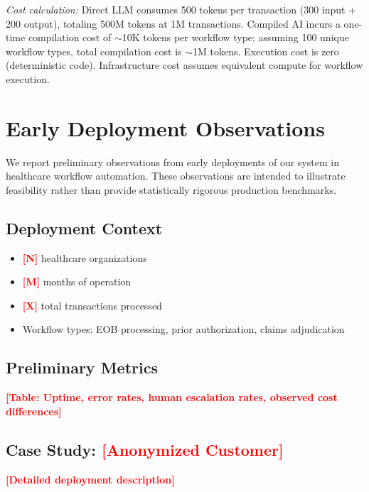 \documentclass[11pt]{article}
\newcommand{\placeholder}[1]{\textcolor{red}{\textbf{[#1]}}}
\begin{document}
\noindent\textit{Cost calculation:} Direct LLM consumes 500 tokens per transaction (300 input + 200 output), totaling 500M tokens at 1M transactions. Compiled AI incurs a one-time compilation cost of $\sim$10K tokens per workflow type; assuming 100 unique workflow types, total compilation cost is $\sim$1M tokens. Execution cost is zero (deterministic code). Infrastructure cost assumes equivalent compute for workflow execution.

\section{Early Deployment Observations}
\label{sec:deployment}

We report preliminary observations from early deployments of our system in healthcare workflow automation. These observations are intended to illustrate feasibility rather than provide statistically rigorous production benchmarks.

\subsection{Deployment Context}

\begin{itemize}
    \item \placeholder{N} healthcare organizations
    \item \placeholder{M} months of operation
    \item \placeholder{X} total transactions processed
    \item Workflow types: EOB processing, prior authorization, claims adjudication
\end{itemize}

\subsection{Preliminary Metrics}

\placeholder{Table: Uptime, error rates, human escalation rates, observed cost differences}

\subsection{Case Study: \placeholder{Anonymized Customer}}

\placeholder{Detailed deployment description}
\end{document}
